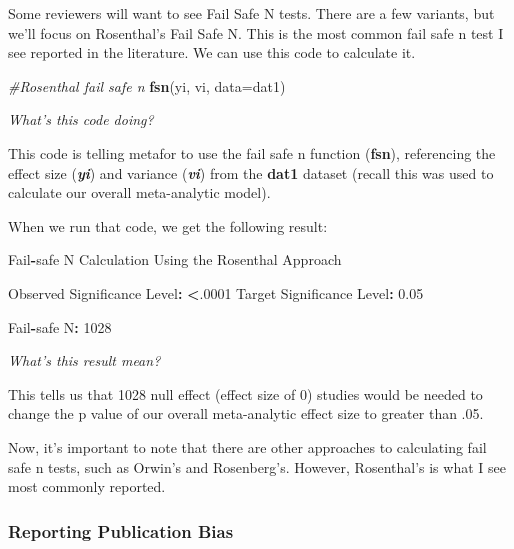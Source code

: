 \documentclass[
]{book}
\newenvironment{Shaded}{\begin{snugshade}}{\end{snugshade}}
\newcommand{\AttributeTok}[1]{\textcolor[rgb]{0.13,0.29,0.53}{#1}}
\newcommand{\CommentTok}[1]{\textcolor[rgb]{0.56,0.35,0.01}{\textit{#1}}}
\newcommand{\DecValTok}[1]{\textcolor[rgb]{0.00,0.00,0.81}{#1}}
\newcommand{\ErrorTok}[1]{\textcolor[rgb]{0.64,0.00,0.00}{\textbf{#1}}}
\newcommand{\FloatTok}[1]{\textcolor[rgb]{0.00,0.00,0.81}{#1}}
\newcommand{\FunctionTok}[1]{\textcolor[rgb]{0.13,0.29,0.53}{\textbf{#1}}}
\newcommand{\NormalTok}[1]{#1}
\newcommand{\SpecialCharTok}[1]{\textcolor[rgb]{0.81,0.36,0.00}{\textbf{#1}}}
\begin{document}
Some reviewers will want to see Fail Safe N tests. There are a few variants, but we'll focus on Rosenthal's Fail Safe N. This is the most common fail safe n test I see reported in the literature. We can use this code to calculate it.

\begin{Shaded}
\begin{Highlighting}[]
\CommentTok{\#Rosenthal fail safe n}
\FunctionTok{fsn}\NormalTok{(yi, vi, }\AttributeTok{data=}\NormalTok{dat1)}
\end{Highlighting}
\end{Shaded}

\emph{What's this code doing?}

This code is telling metafor to use the fail safe n function (\textbf{fsn}), referencing the effect size (\textbf{\emph{yi}}) and variance (\textbf{\emph{vi}}) from the \textbf{dat1} dataset (recall this was used to calculate our overall meta-analytic model).

When we run that code, we get the following result:

\begin{Shaded}
\begin{Highlighting}[]
\NormalTok{Fail}\SpecialCharTok{{-}}\NormalTok{safe N Calculation Using the Rosenthal Approach}

\NormalTok{Observed Significance Level}\SpecialCharTok{:} \ErrorTok{\textless{}}\NormalTok{.}\DecValTok{0001}
\NormalTok{Target Significance Level}\SpecialCharTok{:}   \FloatTok{0.05}

\NormalTok{Fail}\SpecialCharTok{{-}}\NormalTok{safe N}\SpecialCharTok{:} \DecValTok{1028}
\end{Highlighting}
\end{Shaded}

\emph{What's this result mean?}

This tells us that 1028 null effect (effect size of 0) studies would be needed to change the p value of our overall meta-analytic effect size to greater than .05.

Now, it's important to note that there are other approaches to calculating fail safe n tests, such as Orwin's and Rosenberg's. However, Rosenthal's is what I see most commonly reported.

\hypertarget{reporting-publication-bias}{%
\subsubsection{Reporting Publication Bias}\label{reporting-publication-bias}}
\end{document}
